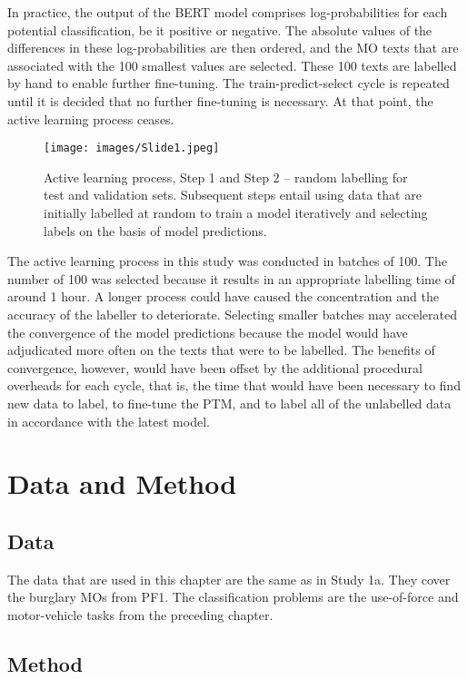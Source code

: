 In practice, the output of the BERT model comprises log-probabilities for each potential classification, be it positive or negative. The absolute values of the differences in these log-probabilities are then ordered, and the MO texts that are associated with the 100 smallest values are selected. These 100 texts are labelled by hand to enable further fine-tuning. The train-predict-select cycle is repeated until it is decided that no further fine-tuning is necessary. At that point, the active learning process ceases.

\begin{figure}[!tbp]
  \centering
    \texttt{[image: images/Slide1.jpeg]}
    \caption[Active Learning Process.]{Active learning process, Step 1 and Step 2 – random labelling for test and validation sets. Subsequent steps entail using data that are initially labelled at random to train a model iteratively and selecting labels on the basis of model predictions.}
    \label{fig:active_process}
\end{figure}

 The active learning process in this study was conducted in batches of 100. The number of 100 was selected because it results in an appropriate labelling time of around 1 hour. A longer process could have caused the concentration and the accuracy of the labeller to deteriorate. Selecting smaller batches may accelerated the convergence of the model predictions because the model would have adjudicated more often on the texts that were to be labelled. The benefits of convergence, however, would have been offset by the additional procedural overheads for each cycle, that is, the time that would have been necessary to find new data to label, to fine-tune the PTM, and to label all of the unlabelled data in accordance with the latest model.

\section{Data and Method}

\subsection{Data}

The data that are used in this chapter are the same as in Study 1a. They cover the burglary MOs from PF1. The classification problems are the use-of-force and motor-vehicle tasks from the preceding chapter.

\subsection{Method}

